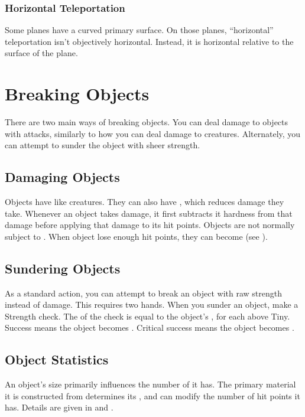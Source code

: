     \subsubsection{Horizontal Teleportation}
      Some planes have a curved primary surface.
      On those planes, ``horizontal'' teleportation isn't objectively horizontal.
      Instead, it is horizontal relative to the surface of the plane.

\section{Breaking Objects}
  There are two main ways of breaking objects.
  You can deal damage to objects with attacks, similarly to how you can deal damage to creatures.
  Alternately, you can attempt to sunder the object with sheer strength.

  \subsection{Damaging Objects}
    Objects have  like creatures.
    They can also have , which reduces damage they take.
    Whenever an object takes damage, it first subtracts it hardness from that damage before applying that damage to its hit points.
    Objects are not normally subject to .
    When object lose enough hit points, they can become  (see ).

  \subsection{Sundering Objects}
    As a standard action, you can attempt to break an object with raw strength instead of damage.
    This requires two hands.
    When you sunder an object, make a Strength check.
    The  of the check is equal to the object's ,  for each  above Tiny.
    Success means the object becomes .
    Critical success means the object becomes .

  \subsection{Object Statistics}
    An object's size primarily influences the number of  it has.
    The primary material it is constructed from determines its , and can modify the number of hit points it has.
    Details are given in  and .

